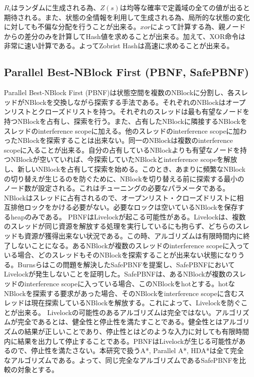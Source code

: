 \documentclass{jsarticle}
\begin{document}
$R_{i}$はランダムに生成される為、$Z(s)$は均等な確率で定義域の全ての値が出ると期待される。また、状態の全情報を利用して生成される為、局所的な状態の変化に対しても不偏な分配を行うことが出来る。$xor$によって計算する為、親ノードからの差分のみを計算してHash値を求めることが出来る。加えて、XOR命令は非常に速い計算である。よってZobrist Hashは高速に求めることが出来る。



\subsection{Parallel Best-NBlock First (PBNF, SafePBNF)}
Parallel Best-NBlock First (PBNF)は状態空間を複数のNBlockに分割し、各スレッドがNBlockを交換しながら探索する手法である\cite{Burns2010}。それぞれのNBlockはオープンリストとクローズドリストを持つ。それぞれのスレッドは最も有望なノードを持つNBlockを占有し、探索を行う。また、占有したNBlockに隣接するNBlockをスレッドのinterference scopeに加える。他のスレッドのinterference scopeに加わったNBlockを探索することは出来ない。同一のNBlockは複数のinterference scopeに入ることが出来る。自分の占有しているNBlockよりも有望なノードを持つNBlockが空いていれば、今探索していたNBlockとinterference scopeを解放し、新しいNBlockを占有して探索を始める。このとき、あまりに頻繁なNBlockの切り替えが生じるのを防ぐために、NBlockを切り替える前に探索する最小のノード数が設定される。これはチューニングの必要なパラメータである。NBlockはスレッドに占有されるので、オープンリスト・クローズドリストに相互排他ロックをかける必要がない。必要なロックは空いているNBlockを保存するheapのみである。
PBNFはLivelockが起こる可能性がある。Livelockは、複数のスレッドが同じ資源を解放する処理を実行しているにも拘らず、どちらのスレッドも資源が獲得出来ない状況である。この時、アルゴリズムは有限時間内に終了しないことになる。あるNBlockが複数のスレッドのinterference scopeに入っている場合、どのスレッドもそのNBlockを探索することが出来ない状態になりうる。Burnsらはこの問題を解決したSafePBNFを提案し、SafePBNFにおいてLivelockが発生しないことを証明した。SafePBNFは、あるNBlockが複数のスレッドのinterference scopeに入っている場合、このNBlockをhotとする。hotなNBlockを探索する要求があった場合、そのNBlockをinterference scopeに含むスレッドは現在探索しているNBlockを解放する。これによって、Livelockを防ぐことが出来る。
Livelockの可能性のあるアルゴリズムは完全ではない。アルゴリズムが完全であるとは、健全性と停止性を満たすことである。健全性とはアルゴリズムの結果が正しいことであり、停止性とはどのような入力に対しても有限時間内に結果を出力して停止することである。PBNFはLivelockが生じる可能性があるので、停止性を満たさない。本研究で扱うA*, Parallel A*, HDA*は全て完全なアルゴリズムである。よって、同じ完全なアルゴリズムであるSafePBNFを比較の対象とする。
\end{document}

